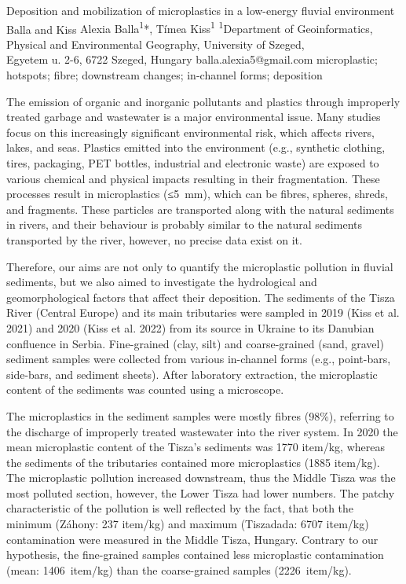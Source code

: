 \abstract
{Deposition and mobilization of microplastics in a low-energy fluvial environment} 
{Balla and Kiss} 
{Alexia Balla\textsuperscript{1}*, Tímea Kiss\textsuperscript{1}} 
{\TLtag} 
{
\textsuperscript{1}Department of Geoinformatics, Physical and Environmental Geography, University of Szeged, \\Egyetem u. 2-6, 6722 Szeged, Hungary
}
{balla.alexia5@gmail.com}  %
{microplastic; hotspots; fibre; downstream changes; in-channel forms; deposition}
{The emission of organic and inorganic pollutants and plastics through improperly treated garbage and wastewater is a major environmental issue. Many studies focus on this increasingly significant environmental risk, which affects rivers, lakes, and seas. Plastics emitted into the environment (e.g., synthetic clothing, tires, packaging, PET bottles, industrial and electronic waste) are exposed to various chemical and physical impacts resulting in their fragmentation. These processes result in microplastics (≤5~mm), which can be fibres, spheres, shreds, and fragments. These particles are transported along with the natural sediments in rivers, and their behaviour is probably similar to the natural sediments transported by the river, however, no precise data exist on it. 

Therefore, our aims are not only to quantify the microplastic pollution in fluvial sediments, but we also aimed to investigate the hydrological and geomorphological factors that affect their deposition. The sediments of the Tisza River (Central Europe) and its main tributaries were sampled in 2019 (Kiss et al. 2021) and 2020 (Kiss et al. 2022) from its source in Ukraine to its Danubian confluence in Serbia. Fine-grained (clay, silt) and coarse-grained (sand, gravel) sediment samples were collected from various in-channel forms (e.g., point-bars, side-bars, and sediment sheets). After laboratory extraction, the microplastic content of the sediments was counted using a microscope.

The microplastics in the sediment samples were mostly fibres (98\%), referring to the discharge of improperly treated wastewater into the river system. In 2020 the mean microplastic content of the Tisza’s sediments was 1770 item/kg, whereas the sediments of the tributaries contained more microplastics (1885 item/kg). The microplastic pollution increased downstream, thus the Middle Tisza was the most polluted section, however, the Lower Tisza had lower numbers. The patchy characteristic of the pollution is well reflected by the fact, that both the minimum (Záhony: 237 item/kg) and maximum (Tiszadada: 6707 item/kg) contamination were measured in the Middle Tisza, Hungary.
Contrary to our hypothesis, the fine-grained samples contained less microplastic contamination (mean: 1406~item/kg) than the coarse-grained samples (2226~item/kg). 

}
